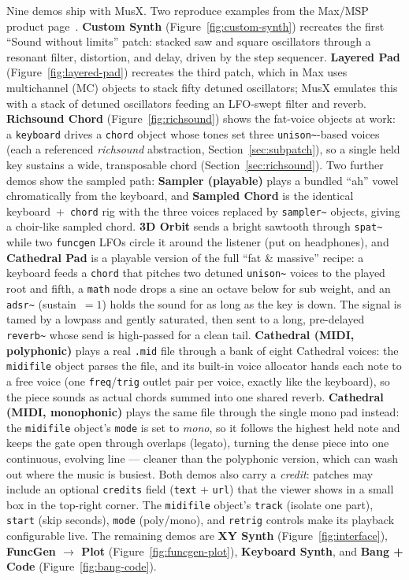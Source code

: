 \documentclass[11pt,letterpaper]{article}
\begin{document}
Nine demos ship with MusX. Two reproduce examples from the Max/MSP product
page~\cite{maxmsp}. \textbf{Custom Synth} (Figure~\ref{fig:custom-synth}) recreates the
first ``Sound without limits'' patch: stacked saw and square oscillators through a resonant
filter, distortion, and delay, driven by the step sequencer. \textbf{Layered Pad}
(Figure~\ref{fig:layered-pad}) recreates the third patch, which in Max uses multichannel
(MC) objects to stack fifty detuned oscillators; MusX emulates this with a stack of detuned
oscillators feeding an LFO-swept filter and reverb. \textbf{Richsound Chord}
(Figure~\ref{fig:richsound}) shows the fat-voice objects at work: a \texttt{keyboard} drives a
\texttt{chord} object whose tones set three \texttt{unison\~{}}-based voices (each a referenced
\emph{richsound} abstraction, Section~\ref{sec:subpatch}), so a single held key sustains a wide,
transposable chord (Section~\ref{sec:richsound}). Two further demos show the sampled path: \textbf{Sampler (playable)} plays a bundled ``ah'' vowel
chromatically from the keyboard, and \textbf{Sampled Chord} is the identical keyboard~+~\texttt{chord}
rig with the three voices replaced by \texttt{sampler\~{}} objects, giving a choir-like sampled
chord. \textbf{3D Orbit} sends a bright sawtooth through \texttt{spat\~{}} while two \texttt{funcgen}
LFOs circle it around the listener (put on headphones), and \textbf{Cathedral Pad} is a playable
version of the full ``fat \& massive'' recipe: a keyboard feeds a \texttt{chord} that pitches
two detuned \texttt{unison\~{}} voices to the played root and fifth, a \texttt{math} node drops a
sine an octave below for sub weight, and an \texttt{adsr\~{}} (sustain~$=1$) holds the sound for
as long as the key is down. The signal is tamed by a lowpass and gently saturated, then sent to a
long, pre-delayed \texttt{reverb\~{}} whose send is high-passed for a clean tail.
\textbf{Cathedral (MIDI, polyphonic)} plays a real \texttt{.mid} file through a bank of eight
Cathedral voices: the \texttt{midifile} object parses the file, and its built-in voice allocator
hands each note to a free voice (one \texttt{freq}/\texttt{trig} outlet pair per voice, exactly
like the keyboard), so the piece sounds as actual chords summed into one shared reverb.
\textbf{Cathedral (MIDI, monophonic)} plays the same file through the single mono pad instead:
the \texttt{midifile} object's \texttt{mode} is set to \emph{mono}, so it follows the highest held
note and keeps the gate open through overlaps (legato), turning the dense piece into one
continuous, evolving line — cleaner than the polyphonic version, which can wash out where the
music is busiest. Both demos also carry a \emph{credit}: patches may include an optional
\texttt{credits} field (\texttt{text} + \texttt{url}) that the viewer shows in a small box in the
top-right corner. The \texttt{midifile} object's \texttt{track} (isolate one part),
\texttt{start} (skip seconds), \texttt{mode} (poly/mono), and \texttt{retrig} controls make its
playback configurable live. The remaining demos are \textbf{XY Synth}
(Figure~\ref{fig:interface}), \textbf{FuncGen $\rightarrow$ Plot} (Figure~\ref{fig:funcgen-plot}),
\textbf{Keyboard Synth}, and \textbf{Bang + Code} (Figure~\ref{fig:bang-code}).
\end{document}
